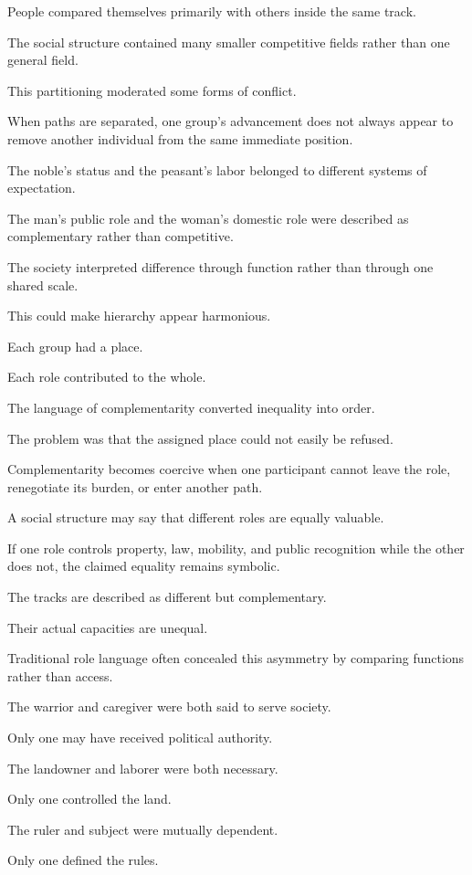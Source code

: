 People compared themselves primarily with others inside the same track.

The social structure contained many smaller competitive fields rather than one general field.

This partitioning moderated some forms of conflict.

When paths are separated, one group’s advancement does not always appear to remove another individual from the same immediate position.

The noble’s status and the peasant’s labor belonged to different systems of expectation.

The man’s public role and the woman’s domestic role were described as complementary rather than competitive.

The society interpreted difference through function rather than through one shared scale.

This could make hierarchy appear harmonious.

Each group had a place.

Each role contributed to the whole.

The language of complementarity converted inequality into order.

The problem was that the assigned place could not easily be refused.

Complementarity becomes coercive when one participant cannot leave the role, renegotiate its burden, or enter another path.

A social structure may say that different roles are equally valuable.

If one role controls property, law, mobility, and public recognition while the other does not, the claimed equality remains symbolic.

The tracks are described as different but complementary.

Their actual capacities are unequal.

Traditional role language often concealed this asymmetry by comparing functions rather than access.

The warrior and caregiver were both said to serve society.

Only one may have received political authority.

The landowner and laborer were both necessary.

Only one controlled the land.

The ruler and subject were mutually dependent.

Only one defined the rules.

